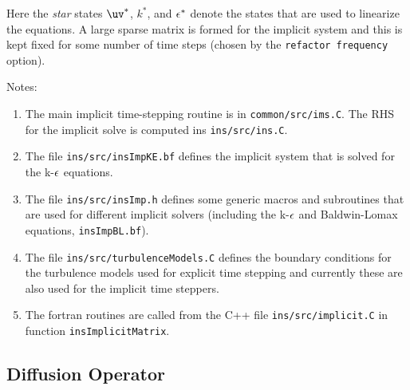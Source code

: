 Here the {\em star} states $\uv^{*}$, $k^*$, and $\epsilon^*$ denote the states that are used to linearize the equations. 
A large sparse matrix is formed for the implicit system and this is kept fixed for some number of
time steps (chosen by the {\tt refactor frequency} option).


Notes:
\begin{enumerate}
  \item The main implicit time-stepping routine is in {\tt common/src/ims.C}. 
      The RHS for the implicit solve is computed ins {\tt ins/src/ins.C}. 
  \item The file {\tt ins/src/insImpKE.bf} defines the implicit system that is solved for the k-$\epsilon$ equations.
  \item The file {\tt ins/src/insImp.h} defines some generic macros and subroutines that are used for different
    implicit solvers (including the k-$\epsilon$ and Baldwin-Lomax equations, {\tt insImpBL.bf}).
  \item The file {\tt ins/src/turbulenceModels.C} defines the boundary conditions for the turbulence models
      used for explicit time stepping and currently these are also used for the implicit time steppers.
  \item The fortran routines are called from the C++ file {\tt ins/src/implicit.C} in function {\tt insImplicitMatrix}.
\end{enumerate}


\subsection{Diffusion Operator}

